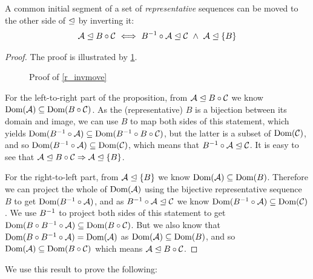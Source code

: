 \begin{mylem}\label{r_invmove}
A common initial segment of a set of \emph{representative} sequences can be moved 
to the other side of $\trianglelefteq$ by inverting it:
\begin{gather*}
{\mathcal{A}}\trianglelefteq{B\circ\mathcal{C}}
\ \Longleftrightarrow \ {B^{-1}\circ\mathcal{A}}\trianglelefteq{\mathcal{C}} 
\ \wedge \  {\mathcal{A}}\trianglelefteq{\{B\}}
\end{gather*}
\end{mylem}
\begin{proof}

The proof is illustrated by \cref{fig_invmove}.

\begin{figure}[htb]

\caption{Proof of \cref{r_invmove}}\label{fig_invmove}
\end{figure}

For the left-to-right part of the proposition,
from ${\mathcal{A}}\trianglelefteq{B\circ\mathcal{C}}$ we know $\textrm{Dom}({\mathcal{A}}) \subseteq \textrm{Dom}({B\circ\mathcal{C}})$.
As the (representative) $B$ is a bijection between its domain and image,
we can use $B$ to map both sides of this statement, which yields
$\textrm{Dom}({B^{-1}\circ\mathcal{A}}) \subseteq \textrm{Dom}({B^{-1}\circ B\circ\mathcal{C}})$,
but the latter is a subset of $\textrm{Dom}({\mathcal{C}})$,
and so $\textrm{Dom}({B^{-1}\circ\mathcal{A}}) \subseteq \textrm{Dom}({\mathcal{C}})$,
which means that ${B^{-1}\circ\mathcal{A}}\trianglelefteq{\mathcal{C}}$.
It is easy to see that ${\mathcal{A}}\trianglelefteq{B\circ\mathcal{C}} \Rightarrow {\mathcal{A}}\trianglelefteq{\{B\}}$.

For the right-to-left part,
from ${\mathcal{A}}\trianglelefteq{\{B\}}$ we know $\textrm{Dom}({\mathcal{A}}) \subseteq \textrm{Dom}({B})$.
Therefore we can project the whole of $\textrm{Dom}({\mathcal{A}})$ using the bijective representative sequence $B$
to get $\textrm{Dom}({B^{-1}\circ\mathcal{A}})$, and as ${B^{-1}\circ\mathcal{A}}\trianglelefteq{\mathcal{C}}$
we know
$\textrm{Dom}({B^{-1}\circ\mathcal{A}}) \subseteq \textrm{Dom}({\mathcal{C}})$.
We use $B^{-1}$ to project both sides of this statement to get
$\textrm{Dom}({B\circ B^{-1}\circ\mathcal{A}}) \subseteq \textrm{Dom}({B\circ\mathcal{C}})$.
But we also know that $\textrm{Dom}({B\circ B^{-1}\circ\mathcal{A}}) = \textrm{Dom}({\mathcal{A}})$
as $\textrm{Dom}({\mathcal{A}}) \subseteq \textrm{Dom}({B})$,
and so $\textrm{Dom}({\mathcal{A}}) \subseteq \textrm{Dom}({B\circ\mathcal{C}})$ which means
${\mathcal{A}}\trianglelefteq{B\circ\mathcal{C}}$.
\end{proof}

We use this result to prove the following:

